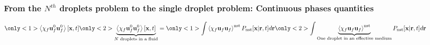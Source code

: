 \documentclass{sintefbeamer}
\begin{document}
\begin{frame}
  \frametitle{From the $N^{th}$ droplets problem to the single droplet problem: Continuous phases quantities}
  
  \begin{equation*}
    \only<1>{\avg{\chi_f\textbf{u}_f^0\textbf{u}_f^0}[\textbf{x},t]}
    \only<2>{\underbrace{\avg{\chi_f\textbf{u}_f^0\textbf{u}_f^0}[\textbf{x},t]}_\text{$N$ droplets in a fluid}}
    =
    \only<1>{\int 
   \avg{\chi_f\textbf{u}_f\textbf{u}_f}^\text{nst}
   P_\text{nst} 
   [\textbf{x}|\textbf{r},t]
    d\textbf{r}}
    \only<2>{\int\underbrace{ 
   \avg{\chi_f\textbf{u}_f\textbf{u}_f}^\text{nst}}_\text{One droplet in an effective medium}
   P_\text{nst} 
   [\textbf{x}|\textbf{r},t]
    d\textbf{r}}
  \end{equation*}

    
\end{frame}
\end{document}
